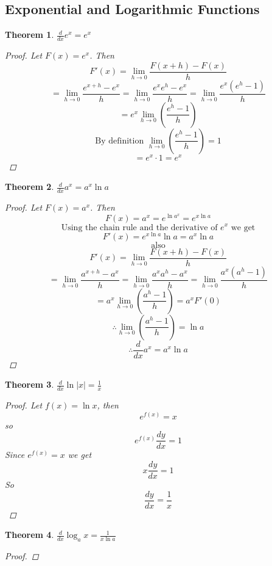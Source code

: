 \documentclass[10pt]{report}
\newtheorem{thm3}{Theorem}[subsection]
\begin{document}
\subsection{Exponential and Logarithmic Functions}
\begin{thm3}
$\frac{d}{dx}e^x=e^x$
\begin{proof}
Let $F(x)=e^x$. Then
$$F'(x)=\lim_{h\to 0}\frac{F(x+h)-F(x)}{h}$$
$$=\lim_{h\to 0}\frac{e^{x+h}-e^x}{h}=\lim_{h\to 0}\frac{e^x e^h -e^x}{h}=\lim_{h\to 0}\frac{e^x(e^h -1)}{h}$$
$$=e^x\lim_{h\to 0}\left(\frac{e^h -1}{h}\right)$$
$$\text{By definition } \lim_{h\to 0}\left(\frac{e^h -1}{h}\right)=1$$
$$=e^x \cdot 1 = e^x$$
\end{proof}
\end{thm3}
\begin{thm3}
$\frac{d}{dx}a^x=a^x\ln a$
\begin{proof}
Let $F(x)=a^x$. Then
$$F(x)= a^x = e^{\ln{a^x}}=e^{x\ln{a}}$$
$$\text{Using the chain rule and the derivative of $e^x$ we get}$$ $$F'(x)=e^{x\ln{a}}\ln{a}=a^x\ln{a}$$
$$\text{also}$$
$$F'(x)=\lim_{h\to 0}\frac{F(x+h)-F(x)}{h}$$
$$=\lim_{h\to 0}\frac{a^{x+h}-a^x}{h}=\lim_{h\to 0}\frac{a^x a^h -a^x}{h}=\lim_{h\to 0}\frac{a^x(a^h -1)}{h}$$
$$=a^x\lim_{h\to 0}\left(\frac{a^h -1}{h}\right)= a^x F'(0)$$
$$\therefore \lim_{h\to 0}\left(\frac{a^h -1}{h}\right)=\ln{a}$$
$$\therefore \frac{d}{dx}a^x=a^x\ln a$$
\end{proof}
\end{thm3}
\begin{thm3}
$\frac{d}{dx}\ln |x|=\frac{1}{x}$
\begin{proof}
Let $f(x) = \ln x$, then
$$e^{f(x)} = x$$
so
$$e^{f(x)}\frac{dy}{dx} = 1$$
Since $e^{f(x)}=x$ we get
$$x\frac{dy}{dx} = 1$$
So
$$\frac{dy}{dx} = \frac{1}{x}$$
\end{proof}
\end{thm3}
\begin{thm3}
$\frac{d}{dx}\log_a x=\frac{1}{x\ln a}$
\begin{proof}

\end{proof}
\end{thm3}
\end{document}

